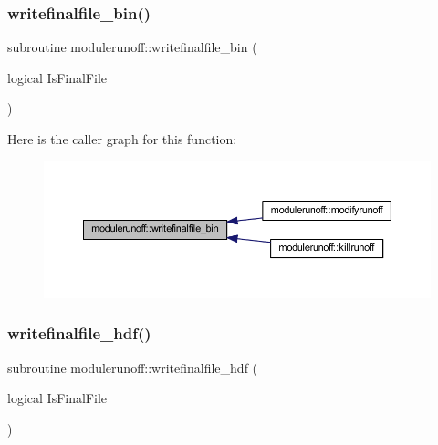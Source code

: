 \subsubsection{\texorpdfstring{writefinalfile\+\_\+bin()}{writefinalfile\_bin()}}
{\footnotesize\ttfamily subroutine modulerunoff\+::writefinalfile\+\_\+bin (\begin{DoxyParamCaption}\item[{logical}]{Is\+Final\+File }\end{DoxyParamCaption})\hspace{0.3cm}{\ttfamily [private]}}

Here is the caller graph for this function\+:
\nopagebreak
\begin{figure}[H]
\begin{center}
\leavevmode
\includegraphics[width=350pt]{namespacemodulerunoff_a2f27139bf5cc235ef3e04522e63d2f5d_icgraph}
\end{center}
\end{figure}
\mbox{\label{namespacemodulerunoff_af0a5f9cb46a0d94efdb301f1b582b7c4}} 
\subsubsection{\texorpdfstring{writefinalfile\+\_\+hdf()}{writefinalfile\_hdf()}}
{\footnotesize\ttfamily subroutine modulerunoff\+::writefinalfile\+\_\+hdf (\begin{DoxyParamCaption}\item[{logical}]{Is\+Final\+File }\end{DoxyParamCaption})\hspace{0.3cm}{\ttfamily [private]}}

